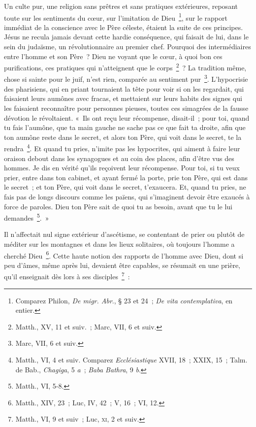 \documentclass[french,twoside]{book} %
\begin{document}
Un culte pur, une religion sans prêtres et sans pratiques extérieures, reposant toute sur les sentiments du cœur, sur l’imitation de Dieu \footnote{ Comparez Philon, {\itshape De migr. Abr}., § 23 et 24 ; {\itshape De vita contemplativa}, en entier.}, sur le rapport immédiat de la conscience avec le Père céleste, étaient la suite de ces principes. Jésus ne recula jamais devant cette hardie conséquence, qui faisait de lui, dans le sein du judaïsme, un révolutionnaire au premier chef. Pourquoi des intermédiaires entre l’homme et son Père ? Dieu ne voyant que le cœur, à quoi bon ces purifications, ces pratiques qui n’atteignent que le corps \footnote{Matth., XV, 11 et suiv. ; Marc, VII, 6 et suiv.} ? La tradition même, chose si sainte pour le juif, n’est rien, comparée au sentiment pur \footnote{Marc, VII, 6 et suiv.}. L’hypocrisie des pharisiens, qui en priant tournaient la tête pour voir si on les regardait, qui faisaient leurs aumônes avec fracas, et mettaient sur leurs habits des signes qui les faisaient reconnaître pour personnes pieuses, toutes ces simagrées de la fausse dévotion le révoltaient. « Ils ont reçu leur récompense, disait-il ; pour toi, quand tu fais l’aumône, que ta main gauche ne sache pas ce que fait ta droite, afin que ton aumône reste dans le secret, et alors ton Père, qui voit dans le secret, te la rendra \footnote{ Matth., VI, 4 et suiv. Comparez {\itshape Ecclésiastique} XVII, 18 ; XXIX, 15 ; Talm. de Bab., {\itshape Chagiga}, 5 {\itshape a} ; {\itshape Baba Bathra}, 9 {\itshape b}.}. Et quand tu pries, n’imite pas les hypocrites, qui aiment à faire leur oraison debout dans les synagogues et au coin des places, afin d’être vus des hommes. Je dis en vérité qu’ils reçoivent leur récompense. Pour toi, si tu veux prier, entre dans ton cabinet, et ayant fermé la porte, prie ton Père, qui est dans le secret ; et ton Père, qui voit dans le secret, t’exaucera. Et, quand tu pries, ne fais pas de longs discours comme les païens, qui s’imaginent devoir être exaucés à force de paroles. Dieu ton Père sait de quoi tu as besoin, avant que tu le lui demandes \footnote{Matth., VI, 5-8.}. »\par
Il n’affectait nul signe extérieur d’ascétisme, se contentant de prier ou plutôt de méditer sur les montagnes et dans les lieux solitaires, où toujours l’homme a cherché Dieu \footnote{Matth., XIV, 23 ; Luc, IV, 42 ; V, 16 ; VI, 12.}. Cette haute notion des rapports de l’homme avec Dieu, dont si peu d’âmes, même après lui, devaient être capables, se résumait en une prière, qu’il enseignait dès lors à ses disciples \footnote{ Matth., VI, 9 et suiv ; Luc, \textsc{xi}, 2 et suiv.} :\par
\end{document}
